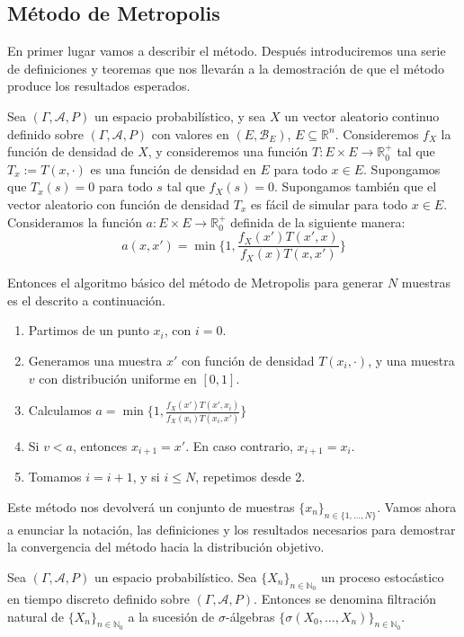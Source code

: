 \subsection{Método de Metropolis}

En primer lugar vamos a describir el método. Después introduciremos una serie de definiciones y teoremas que nos llevarán a la demostración de que el método produce los resultados esperados.

Sea $(\Gamma,\mathcal{A}, P)$ un espacio probabilístico, y sea $X$ un vector aleatorio continuo definido sobre $(\Gamma,\mathcal{A}, P)$ con valores en $(E,\mathscr{B}_E)$, $E\subseteq \mathds{R}^n$. Consideremos $f_X$ la función de densidad de $X$, y consideremos una función $T:E\times E\rightarrow \mathds{R}_0^+$ tal que $T_x:=T(x,\cdot)$ es una función de densidad en $E$ para todo $x\in E$. Supongamos que $T_x(s)=0$ para todo $s$ tal que $f_X(s)=0$. Supongamos también que el vector aleatorio con función de densidad $T_x$ es fácil de simular para todo $x\in E$. Consideramos la función $a:E\times E\rightarrow \mathds{R}_0^+$ definida de la siguiente manera:
$$a(x,x')=\min\{1,\frac{f_X(x')T(x',x)}{f_X(x)T(x,x')}\} $$

Entonces el algoritmo básico del método de Metropolis para generar $N$ muestras es el descrito a continuación.

\begin{enumerate}
\item \label{metMetro} Partimos de un punto $x_i$, con $i=0$.
\item Generamos una muestra $x'$ con función de densidad $T(x_i,\cdot)$, y una muestra $v$ con distribución uniforme en $[0,1]$.
\item Calculamos $a=\min\{1,\frac{f_X(x')T(x',x_i)}{f_X(x_i)T(x_i,x')}\}$
\item Si $v<a$, entonces $x_{i+1}=x'$. En caso contrario, $x_{i+1}=x_i$.
\item Tomamos $i=i+1$, y si $i\leq N$, repetimos desde 2.
\end{enumerate}

Este método nos devolverá un conjunto de muestras $\{x_n\}_{n\in \{1,\ldots ,N\}}$. Vamos ahora a enunciar la notación, las definiciones y los resultados necesarios para demostrar la convergencia del método hacia la distribución objetivo.

\begin{definicion}
Sea $(\Gamma , \mathcal{A}, P)$ un espacio probabilístico. Sea $\{X_n\}_{n\in \mathds{N}_0}$ un proceso estocástico en tiempo discreto definido sobre $(\Gamma, \mathcal{A}, P)$. Entonces se denomina filtración natural de $\{X_n\}_{n\in \mathds{N}_0}$ a la sucesión de $\sigma$-álgebras $\{\sigma(X_0,\ldots , X_n)\}_{n\in \mathds{N}_0}$.
\end{definicion}

